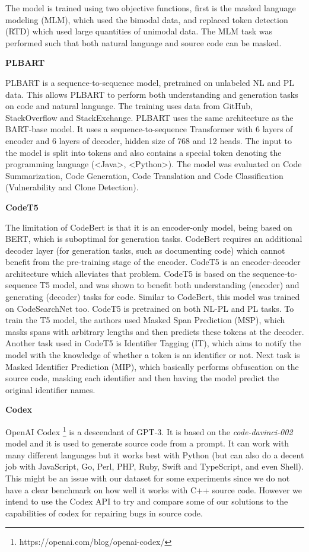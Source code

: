 \documentclass[12pt,a4paper]{report}
\begin{document}
The model is trained using two objective functions, first is the masked language modeling (MLM), which used the bimodal data, and replaced token detection (RTD) which used large quantities of unimodal data. The MLM task was performed such that both natural language and source code can be masked.

\textbf{PLBART}

PLBART \cite{https://doi.org/10.48550/arxiv.2103.06333} is a sequence-to-sequence model, pretrained on unlabeled NL and PL data. This allows PLBART to perform both understanding and generation tasks on code and natural language. The training uses data from GitHub, StackOverflow and StackExchange. PLBART uses the same architecture as the BART-base model. It uses a sequence-to-sequence Transformer with 6 layers of encoder and 6 layers of decoder, hidden size of 768 and 12 heads. The input to the model is split into tokens and also contains a special token denoting the programming language (\textless{Java}\textgreater, \textless{Python}\textgreater). The model was evaluated on Code Summarization, Code Generation, Code Translation and Code Classification (Vulnerability and Clone Detection).

\textbf{CodeT5}

The limitation of CodeBert is that it is an encoder-only model, being based on BERT, which is suboptimal for generation tasks. CodeBert requires an additional decoder layer (for generation tasks, such as documenting code) which cannot benefit from the pre-training stage of the encoder. CodeT5 \cite{https://doi.org/10.48550/arxiv.2109.00859} is an encoder-decoder architecture which alleviates that problem. CodeT5 is based on the sequence-to-sequence T5 model, and was shown to benefit both understanding (encoder) and generating (decoder) tasks for code. Similar to CodeBert, this model was trained on CodeSearchNet too. CodeT5 is pretrained on both NL-PL and PL tasks. To train the T5 model, the authors used Masked Span Prediction (MSP), which masks spans with arbitrary lengths and then predicts these tokens at the decoder. Another task used in CodeT5 is Identifier Tagging (IT), which aims to notify the model with the knowledge of whether a token is an identifier or not. Next task is Masked Identifier Prediction (MIP), which basically performs obfuscation on the source code, masking each identifier and then having the model predict the original identifier names.

\textbf{Codex} 

OpenAI Codex \footnote{https://openai.com/blog/openai-codex/} is a descendant of GPT-3. It is based on the \textit{code-davinci-002} model and it is used to generate source code from a prompt. It can work with many different languages but it works best with Python (but can also do a decent job with JavaScript, Go, Perl, PHP, Ruby, Swift and TypeScript, and even Shell). This might be an issue with our dataset for some experiments since we do not have a clear benchmark on how well it works with C++ source code. However we intend to use the Codex API to try and compare some of our solutions to the capabilities of codex for repairing bugs in source code.
\end{document}

